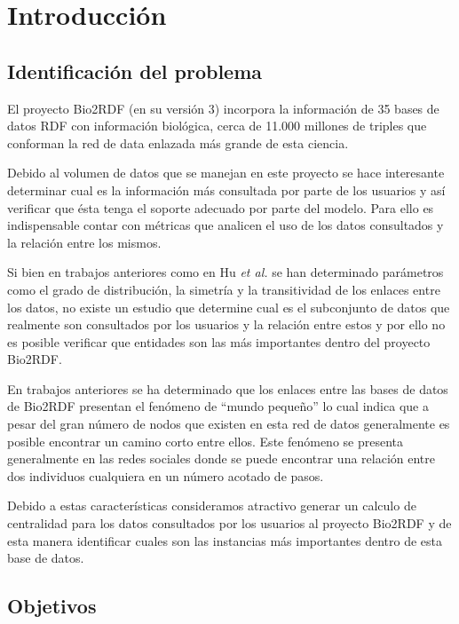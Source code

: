 
\chapter{Introducción}

\section{Identificación del problema}
El proyecto Bio2RDF (en su versión 3) incorpora la información de 35 bases de
datos RDF con información biológica, cerca de 11.000 millones de triples que
conforman la red de data enlazada más grande de esta ciencia.

Debido al volumen de datos que se manejan en este proyecto se hace interesante
determinar cual es la información más consultada por parte de los usuarios y 
así verificar que ésta tenga el soporte adecuado por parte del modelo. 
Para ello es indispensable contar con métricas que analicen el uso de los datos
consultados y la relación entre los mismos.

Si bien en trabajos anteriores como en Hu \emph{et al.}\cite{hu2015link} se han
determinado parámetros como el grado de distribución, la simetría y la
transitividad de los enlaces entre los datos, no existe un estudio
que determine cual es el subconjunto de datos que realmente son consultados por 
los usuarios y la relación entre estos y por ello no es posible verificar que
entidades son las más importantes dentro del proyecto Bio2RDF.

En trabajos anteriores\cite{hu2015link} se ha determinado que los enlaces entre
las bases de datos de Bio2RDF presentan el fenómeno de ``mundo pequeño'' lo cual
indica que a pesar del gran número de nodos que existen en esta red de datos
generalmente es posible encontrar un camino corto entre ellos. Este fenómeno se
presenta generalmente en las redes sociales donde se puede encontrar una
relación entre dos individuos cualquiera en un número acotado de pasos.

Debido a estas características consideramos atractivo generar un calculo de
centralidad para los datos consultados por los usuarios al proyecto Bio2RDF y de
esta manera identificar cuales son las instancias más importantes dentro de esta
base de datos.

\section{Objetivos}

